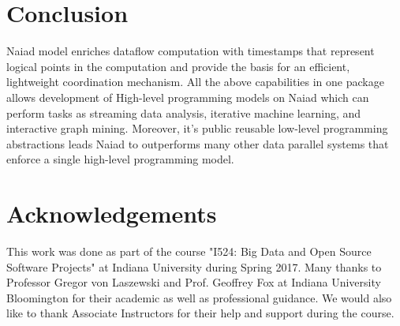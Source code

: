 \documentclass[9pt,twocolumn,twoside]{../../styles/osajnl}
\begin{document}
\section{Conclusion}
Naiad model enriches dataflow computation with timestamps that
represent logical points in the computation and provide the basis for
an efficient, lightweight coordination mechanism. All the above
capabilities in one package allows development of High-level
programming models on Naiad which can perform tasks as streaming data
analysis, iterative machine learning, and interactive graph
mining. Moreover, it’s public reusable low-level programming
abstractions leads Naiad to outperforms many other data parallel
systems that enforce a single high-level programming model.

\section*{Acknowledgements}

This work was done as part of the course "I524: Big Data and Open
Source Software Projects" at Indiana University during Spring
2017. Many thanks to Professor Gregor von Laszewski and Prof. Geoffrey
Fox at Indiana University Bloomington for their academic as well as
professional guidance. We would also like to thank Associate
Instructors for their help and support during the course.


\end{document}

